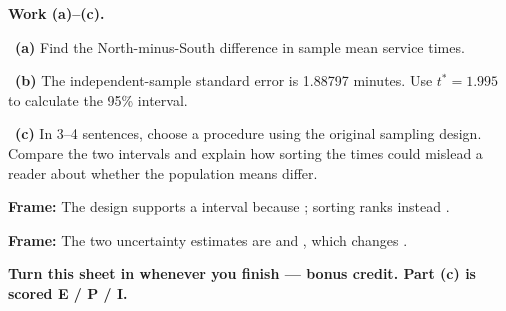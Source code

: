 \documentclass[11pt]{article}
\begin{document}
\newpage
\textbf{Work (a)--(c).}\par\smallskip

~\textbf{(a)} Find the North-minus-South difference in sample mean service times.\par
\workspace{0.8in}

~\textbf{(b)} The independent-sample standard error is 1.88797 minutes. Use $t^*=1.995$ to calculate the 95\% interval.\par
\workspace{1.4in}

~\textbf{(c)} In 3--4 sentences, choose a procedure using the original sampling design. Compare the two intervals and explain how sorting the times could mislead a reader about whether the population means differ.\par
\workspace{2.0in}

\begin{sentenceframebox}\raggedright\textbf{Frame:} The design supports a \blank[1.6in] interval because \blank[2.2in]; sorting ranks instead \blank[2.0in].\end{sentenceframebox}

\begin{sentenceframebox}\raggedright\textbf{Frame:} The two uncertainty estimates are \blank[1.6in] and \blank[1.6in], which changes \blank[2.0in].\end{sentenceframebox}

\textbf{Turn this sheet in whenever you finish --- bonus credit. Part (c) is scored E / P / I.}\par
\end{document}
